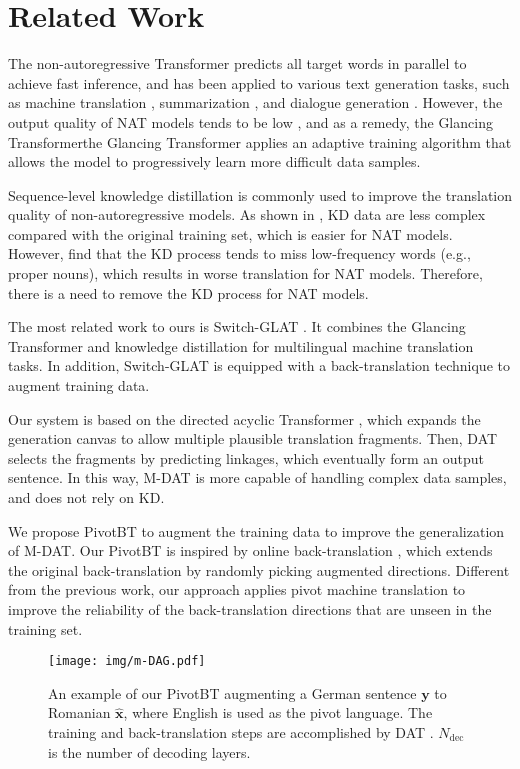 \section{Related Work}
The non-autoregressive Transformer \cite[NAT,][]{gu2018nonautoregressive} predicts all target words in parallel to achieve fast inference, 
and has been applied to various text generation tasks, such as machine translation \cite{gu-kong-2021-fully,dslp}, summarization \cite{su-etal-2021-non,liu2022learning,liu2022character}, and dialogue generation \cite{zou-etal-2021-thinking,qi2021bang}.
However, the output quality of NAT models tends to be low \cite{stern,ghazvininejad-etal-2019-mask}, and as a remedy, the Glancing Transformerthe Glancing Transformer \cite[GLAT,][]{qian-etal-2021-glancing} applies an adaptive training algorithm that allows the model to progressively learn more difficult data samples.

Sequence-level knowledge distillation \cite[KD,][]{kim-rush-2016-sequence} is commonly used to improve the translation quality of non-autoregressive models.
As shown in , KD data are less complex compared with the original training set, which is easier for NAT models. However,  find that the KD process tends to miss low-frequency words (e.g., proper nouns), which results in worse translation for NAT models. Therefore, there is a need to remove the KD process for NAT models.

The most related work to ours is Switch-GLAT \cite{song2022switchglat}. It combines the Glancing Transformer and knowledge distillation for multilingual machine translation tasks. In addition, Switch-GLAT is equipped with a back-translation technique to augment training data.  


Our system is based on the directed acyclic Transformer \cite[DAT,][]{dag},
which expands the generation canvas to allow multiple plausible translation fragments. Then, DAT selects the fragments by predicting linkages, which eventually form an output sentence. 
In this way, M-DAT is more capable of handling complex data samples, and does not rely on KD.

We propose PivotBT to augment the training data to improve the generalization of M-DAT. Our PivotBT is inspired by online back-translation \cite{zhang2020improving}, which extends the original back-translation \cite[BT,][]{bt} by randomly picking augmented directions. Different from the previous work, our approach applies pivot machine translation \cite{pivot} to improve the reliability of the back-translation directions that are unseen in the training set.


\begin{figure}[t]
  \centering
  \texttt{[image: img/m-DAG.pdf]}
  \vspace{-0.5cm}
  \caption{An example of our PivotBT augmenting a German sentence $\mathbf y$ to Romanian $\hat{\mathbf{x}}$, where English is used as the pivot language. The training and back-translation steps are accomplished by DAT \cite{dag}. 
  $N_{\text{dec}}$ is the number of decoding layers.}
  \label{fig:dat}
\end{figure}